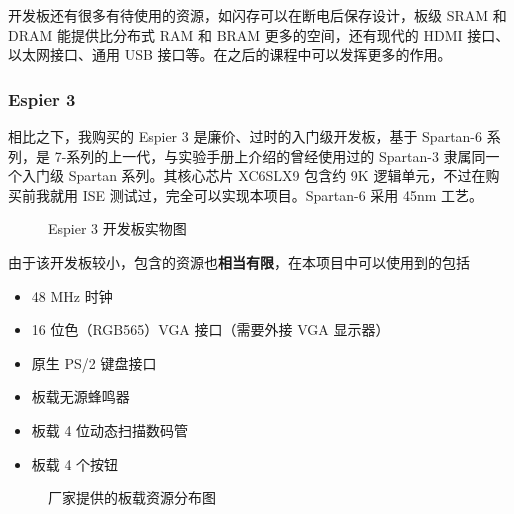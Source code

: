\documentclass[hyperref,UTF8,12pt,a4paper]{ctexart}
\providecommand{\tightlist}{%
  \setlength{\itemsep}{0pt}\setlength{\parskip}{0pt}}
\begin{document}
开发板还有很多有待使用的资源，如闪存可以在断电后保存设计，板级 SRAM 和
DRAM 能提供比分布式 RAM 和 BRAM 更多的空间，还有现代的 HDMI
接口、以太网接口、通用 USB 接口等。在之后的课程中可以发挥更多的作用。

\hypertarget{espier-3}{%
\subsubsection{Espier 3}\label{espier-3}}

相比之下，我购买的 Espier 3 是廉价、过时的入门级开发板，基于 Spartan-6
系列，是 7-系列的上一代，与实验手册上介绍的曾经使用过的 Spartan-3
隶属同一个入门级 Spartan 系列。其核心芯片 XC6SLX9 包含约 9K
逻辑单元，不过在购买前我就用 ISE 测试过，完全可以实现本项目。Spartan-6
采用 45nm 工艺。

\begin{figure}[H]
\centering
{}
\caption{Espier 3 开发板实物图}
\end{figure}

由于该开发板较小，包含的资源也\textbf{相当有限}，在本项目中可以使用到的包括

\begin{itemize}
\tightlist
\item
  48 MHz 时钟
\item
  16 位色（RGB565）VGA 接口（需要外接 VGA 显示器）
\item
  原生 PS/2 键盘接口
\item
  板载无源蜂鸣器
\item
  板载 4 位动态扫描数码管
\item
  板载 4 个按钮
\end{itemize}

\begin{figure}[H]
\centering
{}
\caption{厂家提供的板载资源分布图}
\end{figure}
\end{document}
